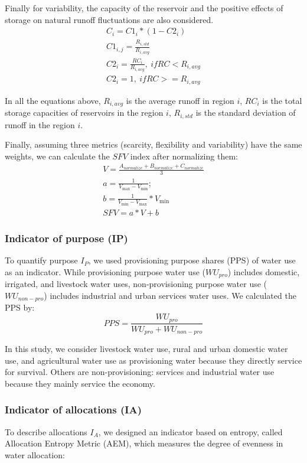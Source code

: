 	Finally for variability, the capacity of the reservoir and the positive effects of storage on natural runoff fluctuations are also considered.
	\begin{gather}
	C_i = C1_i * (1 - C2_i) \\
	C1_{i, j} = \frac{R_{i, std}}{R_{i, avg}} \\
	C2_{i} = \frac{RC_{i}}{R_{i, avg}}, \ if RC < R_{i, avg} \\
	C2_{i} = 1, \ if RC >= R_{i, avg}
	\end{gather}

	In all the equations above, $R_{i, avg}$ is the average runoff in region $i$, $RC_i$ is the total storage capacities of reservoirs in the region $i$, $R_{i, std}$ is the standard deviation of runoff in the region $i$.

	Finally, assuming three metrics (scarcity, flexibility and variability) have the same weights, we can calculate the $SFV$ index after normalizing them:
	\begin{gather}
		V = \frac{A_{normalize} + B_{normalize} + C_{normalize}}{3}\\
		a = \frac{1}{V_{\max} - V_{\min}};\\
		b = \frac{1}{V_{\min} - V_{\max}} * V_{\min}\\
		SFV = a * V + b
	\end{gather}

	\subsubsection{Indicator of purpose (IP)}
	To quantify purpose $I_P$, we used provisioning purpose shares (PPS) of water use as an indicator. While provisioning purpose water use ($WU_{pro}$) includes domestic, irrigated, and livestock water uses, non-provisioning purpose water use ($WU_{non-pro}$) includes industrial and urban services water uses. We calculated the PPS by:
	\begin{equation}
		PPS = \frac{WU_{pro}}{WU_{pro} + WU_{non-pro}}
	\end{equation}

	In this study, we consider livestock water use, rural and urban domestic water use, and agricultural water use as provisioning water because they directly service for survival. Others are non-provisioning: services and industrial water use because they mainly service the economy.

	\subsubsection{Indicator of allocations (IA)}
	To describe allocations $I_A$, we designed an indicator based on entropy, called Allocation Entropy Metric (AEM), which measures the degree of evenness in water allocation:

